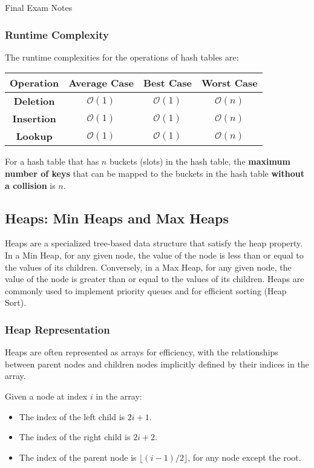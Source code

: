\begin{examnotes}{Final Exam Notes}
    \subsubsection*{Runtime Complexity}

    The runtime complexities for the operations of hash tables are:

    \begin{center}
        \begin{tabular}[ht]{|c|c|c|c|}
            \hline \textbf{Operation} & \textbf{Average Case} & \textbf{Best Case} & \textbf{Worst Case} \\ \hline
            \textbf{Deletion} & $\mathcal{O}(1)$ & $\mathcal{O}(1)$ & $\mathcal{O}(n)$ \\ \hline
            \textbf{Insertion} & $\mathcal{O}(1)$ & $\mathcal{O}(1)$ & $\mathcal{O}(n)$ \\ \hline
            \textbf{Lookup} & $\mathcal{O}(1)$ & $\mathcal{O}(1)$ & $\mathcal{O}(n)$ \\ \hline
        \end{tabular}
    \end{center}
    For a hash table that has $n$ buckets (slots) in the hash table, the \textbf{maximum number of keys} that can be mapped to the buckets in the hash table \textbf{without a collision} is $n$.

    \subsection*{Heaps: Min Heaps and Max Heaps}

    Heaps are a specialized tree-based data structure that satisfy the heap property. In a Min Heap, for any given node, the value of the node is less than or equal to the values of its children. 
    Conversely, in a Max Heap, for any given node, the value of the node is greater than or equal to the values of its children. Heaps are commonly used to implement priority queues and for efficient 
    sorting (Heap Sort).
    
    \subsubsection*{Heap Representation}
    
    Heaps are often represented as arrays for efficiency, with the relationships between parent nodes and children nodes implicitly defined by their indices in the array.
    
    \begin{highlight}
        Given a node at index $i$ in the array:
        \begin{itemize}
            \item The index of the left child is $2i + 1$.
            \item The index of the right child is $2i + 2$.
            \item The index of the parent node is $\lfloor (i-1) / 2 \rfloor$, for any node except the root.
        \end{itemize}
    \end{highlight}
    

\end{examnotes}
